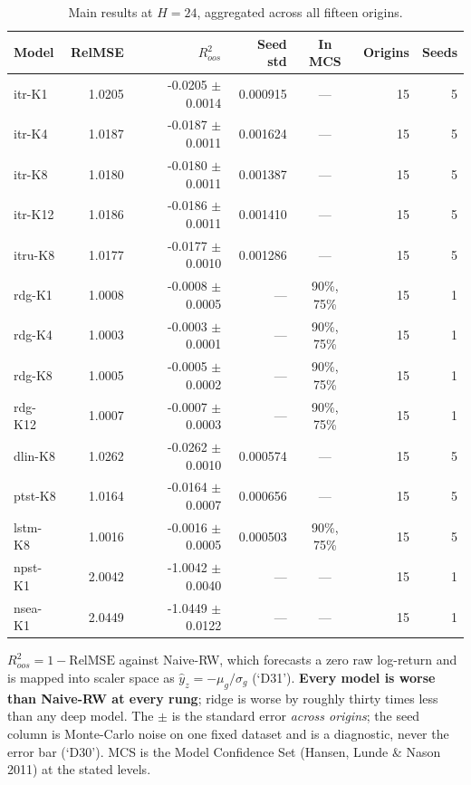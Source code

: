 \begin{table}[!t]
\centering
\caption{Main results at $H=24$, aggregated across all fifteen origins.}
\label{tab:main}
\begin{tabular}{lrrrcrr}
\toprule
Model & RelMSE & $R^2_{oos}$ & Seed std & In MCS & Origins & Seeds \\
\midrule
itr-K1 & 1.0205 & -0.0205 $\pm$ 0.0014 & 0.000915 & --- & 15 & 5 \\
itr-K4 & 1.0187 & -0.0187 $\pm$ 0.0011 & 0.001624 & --- & 15 & 5 \\
itr-K8 & 1.0180 & -0.0180 $\pm$ 0.0011 & 0.001387 & --- & 15 & 5 \\
itr-K12 & 1.0186 & -0.0186 $\pm$ 0.0011 & 0.001410 & --- & 15 & 5 \\
itru-K8 & 1.0177 & -0.0177 $\pm$ 0.0010 & 0.001286 & --- & 15 & 5 \\
rdg-K1 & 1.0008 & -0.0008 $\pm$ 0.0005 & --- & 90\%, 75\% & 15 & 1 \\
rdg-K4 & 1.0003 & -0.0003 $\pm$ 0.0001 & --- & 90\%, 75\% & 15 & 1 \\
rdg-K8 & 1.0005 & -0.0005 $\pm$ 0.0002 & --- & 90\%, 75\% & 15 & 1 \\
rdg-K12 & 1.0007 & -0.0007 $\pm$ 0.0003 & --- & 90\%, 75\% & 15 & 1 \\
dlin-K8 & 1.0262 & -0.0262 $\pm$ 0.0010 & 0.000574 & --- & 15 & 5 \\
ptst-K8 & 1.0164 & -0.0164 $\pm$ 0.0007 & 0.000656 & --- & 15 & 5 \\
lstm-K8 & 1.0016 & -0.0016 $\pm$ 0.0005 & 0.000503 & 90\%, 75\% & 15 & 5 \\
npst-K1 & 2.0042 & -1.0042 $\pm$ 0.0040 & --- & --- & 15 & 1 \\
nsea-K1 & 2.0449 & -1.0449 $\pm$ 0.0122 & --- & --- & 15 & 1 \\
\bottomrule
\end{tabular}
\vspace{2pt}\par\footnotesize $R^2_{oos} = 1 - \text{RelMSE}$ against Naive-RW, which forecasts a zero raw log-return and is mapped into scaler space as $\hat{y}_z = -\mu_g/\sigma_g$ (`D31'). \textbf{Every model is worse than Naive-RW at every rung}; ridge is worse by roughly thirty times less than any deep model. The $\pm$ is the standard error \emph{across origins}; the seed column is Monte-Carlo noise on one fixed dataset and is a diagnostic, never the error bar (`D30'). MCS is the Model Confidence Set (Hansen, Lunde \& Nason 2011) at the stated levels.
\end{table}
